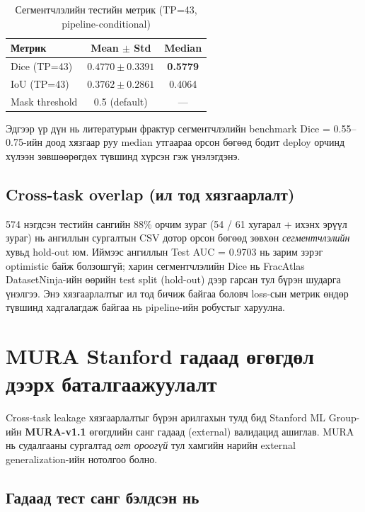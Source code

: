 \begin{table}[!htbp]
    \centering
    \begin{tabular}{l c c}
    \toprule
    \textbf{Метрик} & \textbf{Mean $\pm$ Std} & \textbf{Median} \\
    \midrule
    Dice (TP=43)   & $0.4770 \pm 0.3391$ & \textbf{0.5779} \\[4pt]
    IoU  (TP=43)   & $0.3762 \pm 0.2861$ & 0.4064 \\[4pt]
    Mask threshold & 0.5 (default)       & --- \\
    \bottomrule
    \end{tabular}
    \caption{Сегментчлэлийн тестийн метрик (TP=43, pipeline-conditional)}
    \label{tab:test_seg}
\end{table}

Эдгээр үр дүн нь литературын фрактур сегментчлэлийн benchmark Dice = 0.55--0.75-ийн доод хязгаар руу median утгаараа орсон бөгөөд бодит deploy орчинд хүлээн зөвшөөрөгдөх түвшинд хүрсэн гэж үнэлэгдэнэ.

\subsection*{Cross-task overlap (ил тод хязгаарлалт)}

574 нэгдсэн тестийн сангийн 88\% орчим зураг (54 / 61 хугарал + ихэнх эрүүл зураг) нь ангиллын сургалтын CSV дотор орсон бөгөөд зөвхөн \emph{сегментчлэлийн} хувьд hold-out юм. Иймээс ангиллын Test AUC = 0.9703 нь зарим зэрэг optimistic байж болзошгүй; харин сегментчлэлийн Dice нь FracAtlas DatasetNinja-ийн өөрийн test split (hold-out) дээр гарсан тул бүрэн шударга үнэлгээ. Энэ хязгаарлалтыг ил тод бичиж байгаа боловч loss-сын метрик өндөр түвшинд хадгалагдаж байгаа нь pipeline-ийн робустыг харуулна.

\section{MURA Stanford гадаад өгөгдөл дээрх баталгаажуулалт}
\label{sec:mura_external}

Cross-task leakage хязгаарлалтыг бүрэн арилгахын тулд бид Stanford ML Group-ийн \textbf{MURA-v1.1} өгөгдлийн санг гадаад (external) валидацид ашиглав. MURA нь судалгааны сургалтад \emph{огт ороогүй} тул хамгийн нарийн external generalization-ийн нотолгоо болно.

\subsection*{Гадаад тест санг бэлдсэн нь}

